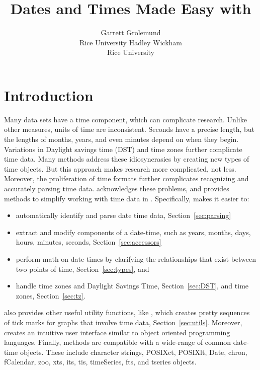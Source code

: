 \documentclass[article]{jss}
\author{Garrett Grolemund\\Rice University \And 
        Hadley Wickham\\Rice University}
\title{Dates and Times Made Easy with \pkg{lubridate}}
\begin{document}
\section{Introduction}

Many data sets have a time component, which can complicate research. Unlike other measures, units of time are inconsistent.  Seconds have a precise length, but the lengths of months, years, and even minutes depend on when they begin. Variations in Daylight savings time (DST) and time zones further complicate time data. Many  methods address these idiosyncrasies by creating new types of time objects.  But this approach makes research more complicated, not less. Moreover, the proliferation of time formats further complicates recognizing and accurately parsing time data.   acknowledges these problems, and provides methods to simplify working with time data in . Specifically,  makes it easier to:

\begin{itemize}
   \item automatically identify and parse date time data, Section~\ref{sec:parsing} 
   
    \item extract and modify components of a date-time, such as years, months, days, hours, minutes, seconds, Section~\ref{sec:accessors}
  
  \item perform math on date-times by clarifying the relationships that exist between two points of time, Section~\ref{sec:types}, and
    
  \item handle time zones and Daylight Savings Time, Section~\ref{sec:DST}, and time zones, Section~\ref{sec:tz}. 
  
\end{itemize}

 also provides other useful utility functions, like , which creates pretty sequences of tick marks for graphs that involve time data,  Section~\ref{sec:utils}. Moreover,  creates an intuitive user interface similar to object oriented programming languages. Finally,  methods are compatible with a wide-range of common date-time objects. These include character strings, POSIXct, POSIXlt, Date, chron, fCalendar, zoo, xts, its, tis, timeSeries, fts, and tseries objects.\\
\end{document}
